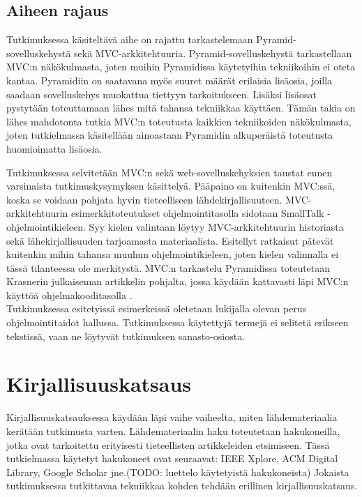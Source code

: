 \documentclass[finnish,utf8,nonumbib,palatino,kandi]{gradu2}
\begin{document}
\subsection{Aiheen rajaus}
Tutkimuksessa käsiteltävä aihe on rajattu tarkastelemaan Pyramid-sovelluskehystä sekä MVC-arkkitehtuuria. Pyramid-sovelluskehystä
tarkastellaan MVC:n näkökulmasta, joten muihin Pyramidissa käytetyihin tekniikoihin ei oteta kantaa. Pyramidiin on saatavana myös suuret määrät erilaisia lisäosia, joilla saadaan sovelluskehys muokattua tiettyyn tarkoitukseen. Lisäksi lisäosat pystytään toteuttamaan lähes mitä tahansa tekniikkaa käyttäen. Tämän takia on lähes mahdotonta tutkia MVC:n toteutusta kaikkien tekniikoiden näkökulmasta, joten tutkielmassa käsitellään ainoastaan Pyramidin alkuperäistä toteutusta huomioimatta lisäosia.

Tutkimuksessa selvitetään MVC:n sekä web-sovelluskehyksien taustat ennen varsinaista tutkimuskysymyksen käsittelyä. Pääpaino
on kuitenkin MVC:ssä, koska se voidaan pohjata hyvin tieteelliseen lähdekirjallisuuteen. MVC-arkkitehtuurin esimerkkitoteutukset ohjelmointitasolla sidotaan SmallTalk -ohjelmointikieleen. 
Syy kielen valintaan löytyy MVC-arkkitehtuurin historiasta sekä lähekirjallisuuden tarjoamasta materiaalista. Esitellyt ratkaisut
pätevät kuitenkin mihin tahansa muuhun ohjelmointikieleen, joten kielen valinnalla ei tässä tilanteessa ole merkitystä. 
 MVC:n tarkastelu Pyramidissa toteutetaan Krasnerin julkaiseman artikkelin pohjalta, jossa käydään kattavasti läpi MVC:n käyttöä ohjelmakooditasolla \cite{Krasner:desc}.  \\

Tutkimuksessa esitetyissä esimerkeissä oletetaan lukijalla olevan perus ohjelmointitaidot hallussa. Tutkimuksessa käytettyjä termejä ei selitetä erikseen tekstissä, vaan ne löytyvät tutkimuksen sanasto-osiosta.


\section{Kirjallisuuskatsaus}
Kirjallisuuskatsauksessa käydään läpi vaihe vaiheelta, miten lähdemateriaalia kerätään
tutkimusta varten. Lähdemateriaalin haku toteutetaan hakukoneilla, jotka ovat tarkoitettu
erityisesti tieteellisten artikkeleiden etsimiseen. Tässä tutkielmassa käytetyt hakukoneet ovat seuraavat:
IEEE Xplore, ACM Digital Library, Google Scholar jne.(TODO: luettelo käytetyistä hakukoneista) Jokaista tutkimuksessa tutkittavaa
tekniikkaa kohden tehdään erillinen kirjallisuuskatsaus. 
\end{document}
